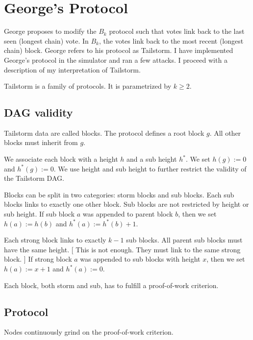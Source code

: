 \bgroup
\newcommand{\height}{h}
\newcommand{\subheight}{h^*}

\newcommand{\subparents}{\operatorname{subparents}}

\section{George's Protocol}

George proposes to modify the $B_k$ protocol such that votes link back to the last seen (longest chain) vote.
In $B_k$, the votes link back to the most recent (longest chain) block.
George refers to his protocol as Tailstorm.
I have implemented George's protocol in the simulator and ran a few attacks.
I proceed with a description of my interpretation of Tailstorm.

Tailstorm is a family of protocols.
It is parametrized by $k \geq 2$.

\subsection{DAG validity}

Tailstorm data are called blocks.
The protocol defines a root block $g$.
All other blocks must inherit from $g$.

We associate each block with a height $\height$ and a sub height $\subheight$.
We set $\height(g) := 0$ and $\subheight(g) := 0$.
We use height and sub height to further restrict the validity of the Tailstorm DAG.

Blocks can be split in two categories: storm blocks and sub blocks.
Each sub blocks links to exactly one other block.
Sub blocks are not restricted by height or sub height.
If sub block $a$ was appended to parent block $b$, then we set $\height(a) := \height(b)$ and $\subheight(a) := \subheight(b) + 1$.

Each strong block links to exactly $k-1$ sub blocks.
All parent sub blocks must have the same height. [ This is not enough. They must link to the same strong block. ]
If strong block $a$ was appended to sub blocks with height $x$, then we set $\height(a) := x + 1$ and $\subheight(a) := 0$.

Each block, both storm and sub, has to fulfill a proof-of-work criterion.

\subsection{Protocol}

Nodes continuously grind on the proof-of-work criterion.

